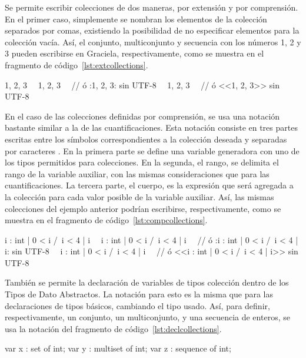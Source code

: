 Se permite escribir colecciones de dos maneras, por extensión y por comprensión.
En el primer caso, simplemente se nombran los elementos de la colección
separados por comas, existiendo la posibilidad de no especificar elementos para
la colección vacía. Así, el conjunto, multiconjunto y secuencia con los números
1, 2 y 3 pueden escribirse en Graciela, respectivamente, como se muestra en el
fragmento de código~\ref{lst:extcollections}.

\begin{gracielacode}[caption=Expresiones de tipos \textit{colección} por extensión, label=lst:extcollections]
{1, 2, 3}
~\Lbag~1, 2, 3~\Rbag~ // ó {:1, 2, 3:} sin UTF-8
~\Lseq~1, 2, 3~\Rseq~ // ó <<1, 2, 3>> sin UTF-8
\end{gracielacode}

En el caso de las colecciones definidas por comprensión, se usa una notación
bastante similar a la de las cuantificaciones. Esta notación consiste en tres
partes escritas entre los símbolos correspondientes a la colección deseada y
separadas por caracteres \ingra{|}. En la primera parte se define una variable
generadora con uno de los tipos permitidos para colecciones. En la segunda, el
rango, se delimita el rango de la variable auxiliar, con las mismas
consideraciones que para las cuantificaciones. La tercera parte, el cuerpo, es
la expresión que será agregada a la colección para cada valor posible de la
variable auxiliar. Así, las mismas colecciones del ejemplo anterior podrían
escribirse, respectivamente, como se muestra en el
fragmento de código~\ref{lst:compcollections}.

\begin{gracielacode}[caption=Expresiones de tipos \textit{colección} por comprensión, label=lst:compcollections]
{i : int | 0 < i /\ i < 4 | i}
~\Lbag~i : int | 0 < i /\ i < 4 | i~\Rbag~
  // ó {:i : int | 0 < i /\ i < 4 | i:} sin UTF-8
~\Lseq~i : int | 0 < i /\ i < 4 | i~\Rseq~
  // ó <<i : int | 0 < i /\ i < 4 | i>> sin UTF-8
\end{gracielacode}

También se permite la declaración de variables de tipos colección dentro de los
Tipos de Dato Abstractos. La notación para esto es la misma que para las
declaraciones de tipos básicos, cambiando el tipo usado. Así, para definir,
respectivamente, un conjunto, un multiconjunto, y una secuencia de enteros, se
usa la notación del fragmento de código~\ref{lst:declcollections}.

\begin{gracielacode}[caption=Declaración de variables de tipos \textit{colección}, label=lst:declcollections]
var x : set of int;
var y : multiset of int;
var z : sequence of int;
\end{gracielacode}

